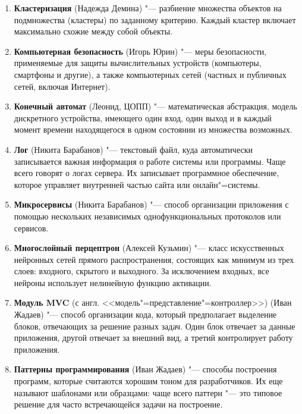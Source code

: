 \documentclass[12pt]{article}
\begin{document}
\begin{enumerate}
    \item \textbf{Кластеризация} (Надежда Демина) "--- разбиение множества объектов на подмножества (кластеры) по заданному критерию. Каждый кластер включает максимально схожие между собой объекты.

    \item \textbf{Компьютерная безопасность} (Игорь Юрин) "--- меры безопасности, применяемые для защиты вычислительных устройств (компьютеры, смартфоны и другие), а также компьютерных сетей (частных и публичных сетей, включая Интернет).

    \item \textbf{Конечный автомат} (Леонид, ЦОПП) "--- математическая абстракция, модель дискретного устройства, имеющего один вход, один выход и в каждый момент времени находящегося в одном состоянии из множества возможных.

    \item \textbf{Лог} (Никита Барабанов) "--- текстовый файл, куда автоматически записывается важная информация о работе системы или программы. Чаще всего говорят о логах сервера. Их записывает программное обеспечение, которое управляет внутренней частью сайта или онлайн"=системы.

    \item \textbf{Микросервисы} (Никита Барабанов) "--- способ организации приложения с помощью нескольких независимых однофункциональных протоколов или сервисов.

    \item \textbf{Многослойный перцептрон} (Алексей Кузьмин) "--- класс искусственных нейронных сетей прямого распространения, состоящих как минимум из трех слоев: входного, скрытого и выходного. За исключением входных, все нейроны использует нелинейную функцию активации.

    \item \textbf{Модуль MVC} (с англ. <<модель"=представление"=контроллер>>) (Иван Жадаев) "--- способ организации кода, который предполагает выделение блоков, отвечающих за решение разных задач. Один блок отвечает за данные приложения, другой отвечает за внешний вид, а третий контролирует работу приложения.

    \item \textbf{Паттерны программирования} (Иван Жадаев) "--- способы построения программ, которые считаются хорошим тоном для разработчиков. Их еще называют шаблонами или образцами: чаще всего паттерн "--- это типовое решение для часто встречающейся задачи на построение.


\end{enumerate}
\end{document}
